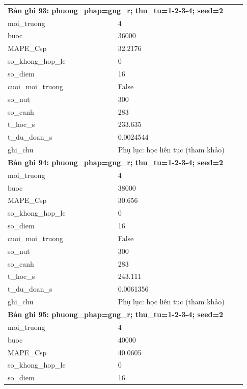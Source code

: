 \begin{longtable}{p{0.43\linewidth}p{0.50\linewidth}}
\midrule
\multicolumn{2}{p{0.95\linewidth}}{\textbf{Bản ghi 93: phuong\_phap=gng\_r; thu\_tu=1-2-3-4; seed=2}} \\
moi\_\allowbreak truong & 4 \\
buoc & 36000 \\
MAPE\_\allowbreak Csp & 32.2176 \\
so\_\allowbreak khong\_\allowbreak hop\_\allowbreak le & 0 \\
so\_\allowbreak diem & 16 \\
cuoi\_\allowbreak moi\_\allowbreak truong & False \\
so\_\allowbreak nut & 300 \\
so\_\allowbreak canh & 283 \\
t\_\allowbreak hoc\_\allowbreak s & 233.635 \\
t\_\allowbreak du\_\allowbreak doan\_\allowbreak s & 0.0024544 \\
ghi\_\allowbreak chu & Phụ lục: học liên tục (tham khảo) \\
\midrule
\multicolumn{2}{p{0.95\linewidth}}{\textbf{Bản ghi 94: phuong\_phap=gng\_r; thu\_tu=1-2-3-4; seed=2}} \\
moi\_\allowbreak truong & 4 \\
buoc & 38000 \\
MAPE\_\allowbreak Csp & 30.656 \\
so\_\allowbreak khong\_\allowbreak hop\_\allowbreak le & 0 \\
so\_\allowbreak diem & 16 \\
cuoi\_\allowbreak moi\_\allowbreak truong & False \\
so\_\allowbreak nut & 300 \\
so\_\allowbreak canh & 283 \\
t\_\allowbreak hoc\_\allowbreak s & 243.111 \\
t\_\allowbreak du\_\allowbreak doan\_\allowbreak s & 0.0061356 \\
ghi\_\allowbreak chu & Phụ lục: học liên tục (tham khảo) \\
\midrule
\multicolumn{2}{p{0.95\linewidth}}{\textbf{Bản ghi 95: phuong\_phap=gng\_r; thu\_tu=1-2-3-4; seed=2}} \\
moi\_\allowbreak truong & 4 \\
buoc & 40000 \\
MAPE\_\allowbreak Csp & 40.0605 \\
so\_\allowbreak khong\_\allowbreak hop\_\allowbreak le & 0 \\
so\_\allowbreak diem & 16 \\

\end{longtable}

